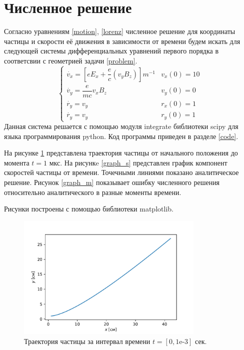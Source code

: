 \documentclass[a4paper]{article}
\begin{document}
\section{Численное решение}
Согласно уравнениям \eqref{motion}, \eqref{lorenz} численное решение для координаты частицы и скорости её движения в зависимости от времени будем искать для следующей системы дифференциальных уравнений первого порядка в соответсвии с геометрией задачи \ref{problem}.
\begin{equation}
	\begin{cases}
		\dot{v_x} = \left[eE_x + \dfrac{e}{c}\left(v_yB_z\right)\right]m^{-1}	
											& 	v_x(0) = 10 \\[10pt]
		\dot{v_y} = \dfrac{e}{mc} v_x B_z	&	v_y(0) = 0 \\[10pt]
		\dot{r_y} = v_y						&	r_x(0) = 1 \\[10pt]
		\dot{r_y} = v_y						&	r_y(0) = 1 
	\end{cases}
\end{equation}
Данная система решается с помощью модуля integrate библиотеки scipy для языка программирования python. Код программы приведен в разделе \ref{code}. 

На рисунке \ref{graph_t} представлена траектория частицы от начального положения до момента $t = 1$ мкс. На рисункe \ref{graph_s} представлен график компонент скоростей частицы от времени. Точечными линиями показано аналитическое решение.  Рисунок \ref{graph_m} показывает ошибку численного решения относительно аналитического в разные моменты времени.

Рисунки построены с помощью библиотеки matplotlib.

\begin{figure}
	\centering
	\includegraphics[width=0.8\textwidth]{plotTrajectory.pdf}
	\caption{Траектория частицы за интервал времени $t = [0, 1\text{e-}3]$ сек.}
	\label{graph_t}
\end{figure}
\end{document}

